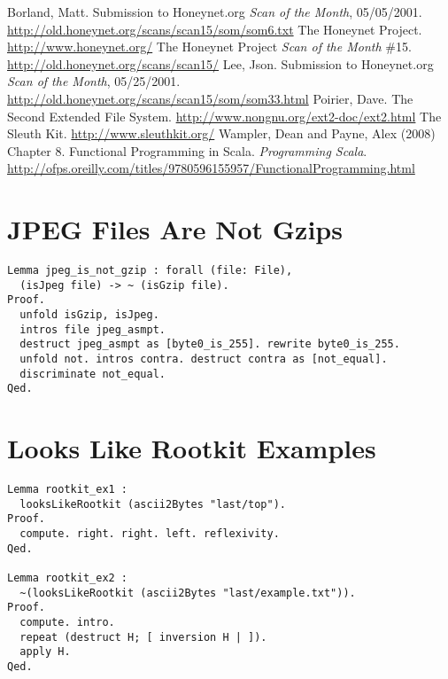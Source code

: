 \documentclass[nocopyrightspace]{sigplanconf}
\begin{document}
\begin{thebibliography}{}
\softraggedright

  Borland, Matt. Submission to Honeynet.org \emph{Scan of the Month},
  05/05/2001. \url{http://old.honeynet.org/scans/scan15/som/som6.txt}
  The Honeynet Project. \url{http://www.honeynet.org/}
  The Honeynet Project \emph{Scan of the Month} \#15.
  \url{http://old.honeynet.org/scans/scan15/}
  Lee, Json. Submission to Honeynet.org \emph{Scan of the Month}, 05/25/2001.
  \url{http://old.honeynet.org/scans/scan15/som/som33.html}
  Poirier, Dave. The Second Extended File System.
  \url{http://www.nongnu.org/ext2-doc/ext2.html}
  The Sleuth Kit. \url{http://www.sleuthkit.org/}
  Wampler, Dean and Payne, Alex (2008) Chapter 8. Functional Programming in
  Scala. {\em Programming Scala}. 
  \url{http://ofps.oreilly.com/titles/9780596155957/FunctionalProgramming.html}

\end{thebibliography}

\appendix

\section{JPEG Files Are Not Gzips}
\begin{lstlisting}
Lemma jpeg_is_not_gzip : forall (file: File),
  (isJpeg file) -> ~ (isGzip file).
Proof.
  unfold isGzip, isJpeg.
  intros file jpeg_asmpt.
  destruct jpeg_asmpt as [byte0_is_255]. rewrite byte0_is_255.
  unfold not. intros contra. destruct contra as [not_equal].
  discriminate not_equal.
Qed.
\end{lstlisting}

\section{Looks Like Rootkit Examples}
\begin{lstlisting}
Lemma rootkit_ex1 : 
  looksLikeRootkit (ascii2Bytes "last/top").
Proof.
  compute. right. right. left. reflexivity.
Qed.

Lemma rootkit_ex2 : 
  ~(looksLikeRootkit (ascii2Bytes "last/example.txt")).
Proof.
  compute. intro.
  repeat (destruct H; [ inversion H | ]).
  apply H.
Qed.
\end{lstlisting}
\end{document}
